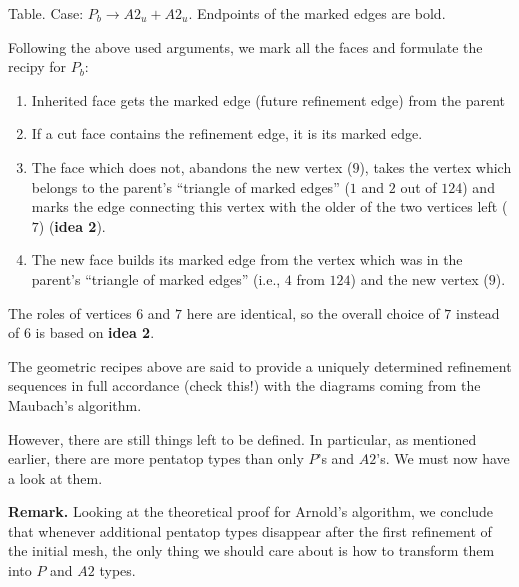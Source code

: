 \documentclass[a4paper,12pt]{amsart}
\numberwithin{equation}{section}
\begin{document}
\begin{itemize}
\begin{minipage}[]{0.5\textwidth}
\begin{center}
  \end{center}
\end{minipage}    

\begin{center}
	Table. Case: $P_b \rightarrow A2_u + A2_u$. Endpoints of the marked edges are bold.
\end{center}    
    
    Following the above used arguments, we mark all the faces and formulate the recipy for $P_b$:
    
    	\begin{enumerate}
		\item Inherited face gets the marked edge (future refinement edge) from the parent
		\item If a cut face contains the refinement edge, it is its marked edge.
		\item The face which does not, abandons the new vertex ($9$), takes the vertex which belongs to the parent's ``triangle of marked edges'' ($1$ and $2$ out of $124$) and marks the edge connecting this vertex with the older of the two vertices left ($7$) (\textbf{idea 2}).
		\item The new face builds its marked edge from the vertex which was in the parent's ``triangle of marked edges'' (i.e., $4$ from $124$)  and the new vertex ($9$).
	\end{enumerate}
	
	The roles of vertices $6$ and $7$ here are identical, so the overall choice of $7$ instead of $6$ is based on \textbf{idea 2}.

\end{itemize}
 
The geometric recipes above are said to provide a uniquely determined refinement sequences in full accordance (check this!) with the diagrams coming from the Maubach's algorithm.

However, there are still things left to be defined. In particular, as mentioned earlier, there are more pentatop types than only $P$'s and $A2$'s. We must now have a look at them.

\textbf{Remark.} Looking at the theoretical proof for Arnold's algorithm, we conclude that whenever additional pentatop types disappear after the first refinement of the initial mesh, the only thing we should care about is how to transform them into $P$ and $A2$ types.
\end{document}
